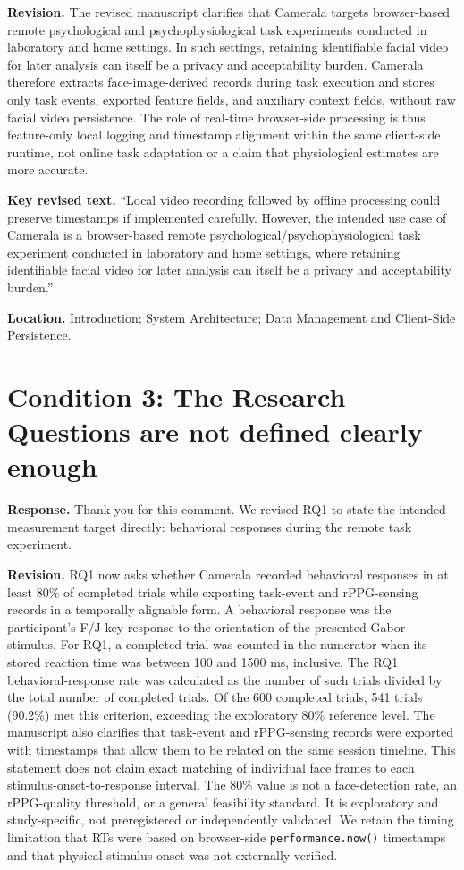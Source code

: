 \documentclass[11pt]{article}
\newcommand{\condition}[2]{\section*{Condition #1: #2}}
\begin{document}
\textbf{Revision.}
The revised manuscript clarifies that Camerala targets browser-based remote psychological and psychophysiological task experiments conducted in laboratory and home settings.
In such settings, retaining identifiable facial video for later analysis can itself be a privacy and acceptability burden.
Camerala therefore extracts face-image-derived records during task execution and stores only task events, exported feature fields, and auxiliary context fields, without raw facial video persistence.
The role of real-time browser-side processing is thus feature-only local logging and timestamp alignment within the same client-side runtime, not online task adaptation or a claim that physiological estimates are more accurate.

\textbf{Key revised text.}
``Local video recording followed by offline processing could preserve timestamps if implemented carefully. However, the intended use case of Camerala is a browser-based remote psychological/psychophysiological task experiment conducted in laboratory and home settings, where retaining identifiable facial video for later analysis can itself be a privacy and acceptability burden.''

\textbf{Location.}
Introduction; System Architecture; Data Management and Client-Side Persistence.

\condition{3}{The Research Questions are not defined clearly enough}
\textbf{Response.}
Thank you for this comment.
We revised RQ1 to state the intended measurement target directly: behavioral responses during the remote task experiment.

\textbf{Revision.}
RQ1 now asks whether Camerala recorded behavioral responses in at least 80\% of completed trials while exporting task-event and rPPG-sensing records in a temporally alignable form.
A behavioral response was the participant's F/J key response to the orientation of the presented Gabor stimulus.
For RQ1, a completed trial was counted in the numerator when its stored reaction time was between 100 and 1500 ms, inclusive.
The RQ1 behavioral-response rate was calculated as the number of such trials divided by the total number of completed trials.
Of the 600 completed trials, 541 trials (90.2\%) met this criterion, exceeding the exploratory 80\% reference level.
The manuscript also clarifies that task-event and rPPG-sensing records were exported with timestamps that allow them to be related on the same session timeline.
This statement does not claim exact matching of individual face frames to each stimulus-onset-to-response interval.
The 80\% value is not a face-detection rate, an rPPG-quality threshold, or a general feasibility standard.
It is exploratory and study-specific, not preregistered or independently validated.
We retain the timing limitation that RTs were based on browser-side \texttt{performance.now()} timestamps and that physical stimulus onset was not externally verified.
\end{document}
